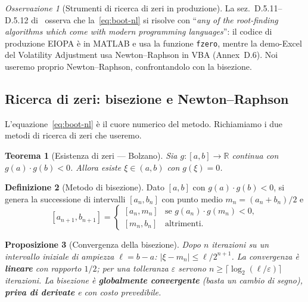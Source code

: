 \documentclass[11pt,a4paper]{article}
\theoremstyle{plain}
\newtheorem{teorema}{Teorema}[section]
\newtheorem{proposizione}[teorema]{Proposizione}
\theoremstyle{definition}
\newtheorem{definizione}[teorema]{Definizione}
\theoremstyle{remark}
\newtheorem*{osservazione}{Osservazione}
\newcommand{\R}{\mathbb{R}}
\newcommand{\abs}[1]{\left\lvert #1 \right\rvert}
\begin{document}
\begin{osservazione}[Strumenti di ricerca di zeri in produzione]
La sez.~D.5.11--D.5.12 di~\cite{eiopa2026} osserva che la~\eqref{eq:boot-nl} si risolve con
``\emph{any of the root-finding algorithms which come with modern programming languages}'': il
codice di produzione EIOPA \`e in MATLAB e usa la funzione \texttt{fzero}, mentre la
demo-Excel del Volatility Adjustment usa Newton--Raphson in VBA (Annex~D.6). Noi useremo
proprio Newton--Raphson, confrontandolo con la bisezione.
\end{osservazione}

\subsection{Ricerca di zeri: bisezione e Newton--Raphson}
\label{sec:zeri}

L'equazione~\eqref{eq:boot-nl} \`e il cuore numerico del metodo. Richiamiamo i due metodi di
ricerca di zeri che useremo.

\begin{teorema}[Esistenza di zeri --- Bolzano]
\label{thm:bolzano}
Sia $g:[a,b]\to\R$ continua con $g(a)\cdot g(b)<0$. Allora esiste $\xi\in(a,b)$ con $g(\xi)=0$.
\end{teorema}

\begin{definizione}[Metodo di bisezione]
Dato $[a,b]$ con $g(a)\cdot g(b)<0$, si genera la successione di intervalli $[a_n,b_n]$ con
punto medio $m_n=(a_n+b_n)/2$ e
\[
  [a_{n+1},b_{n+1}] = \begin{cases}
    [a_n,m_n] & \text{se } g(a_n)\cdot g(m_n)<0,\\
    [m_n,b_n] & \text{altrimenti.}
  \end{cases}
\]
\end{definizione}

\begin{proposizione}[Convergenza della bisezione]
\label{prop:bisez}
Dopo $n$ iterazioni su un intervallo iniziale di ampiezza $\ell=b-a$: $\abs{\xi-m_n}\le
\ell/2^{n+1}$. La convergenza \`e \textbf{lineare} con rapporto $1/2$; per una tolleranza
$\varepsilon$ servono $n\ge\lceil\log_2(\ell/\varepsilon)\rceil$ iterazioni. La bisezione \`e
\textbf{globalmente convergente} (basta un cambio di segno), \textbf{priva di derivate} e con
costo prevedibile.
\end{proposizione}
\end{document}
